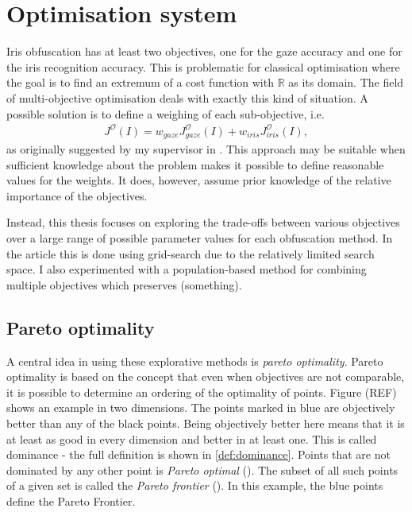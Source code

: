 \section{Optimisation system}
Iris obfuscation has at least two objectives, one for the gaze accuracy and one for the iris recognition accuracy. This is problematic for classical optimisation where the goal is to find an extremum of a cost function with $\mathbb{R}$ as its domain. The field of multi-objective optimisation deals with exactly this kind of situation. A possible solution is to define a weighing of each sub-objective, i.e.
\begin{align}
	J^{\mathcal{O}}(I) = w_{gaze}J_{gaze}^{\mathcal{O}}(I) +  w_{iris}J_{iris}^{\mathcal{O}}(I),
\end{align}
as originally suggested by my supervisor in \cite{proposal}. This approach may be suitable when sufficient knowledge about the problem makes it possible to define reasonable values for the weights. It does, however, assume prior knowledge of the relative importance of the objectives. 

Instead, this thesis focuses on exploring the trade-offs between various objectives over a large range of possible parameter values for each obfuscation method. In the article this is done using grid-search due to the relatively limited search space. I also experimented with a population-based method for combining multiple objectives which preserves (something).

\subsection{Pareto optimality}
A central idea in using these explorative methods is \textit{pareto optimality}. Pareto optimality is based on the concept that even when objectives are not comparable, it is possible to determine an ordering of the optimality of points. Figure (REF) shows an example in two dimensions. The points marked in blue are objectively better than any of the black points. Being objectively better here means that it is at least as good in every dimension and better in at least one. This is called dominance - the full definition is shown in \cref{def:dominance}. Points that are not dominated by any other point is \textit{Pareto optimal} (). The subset of all such points of a given set is called the \textit{Pareto frontier} (). In this example, the blue points define the Pareto Frontier.

